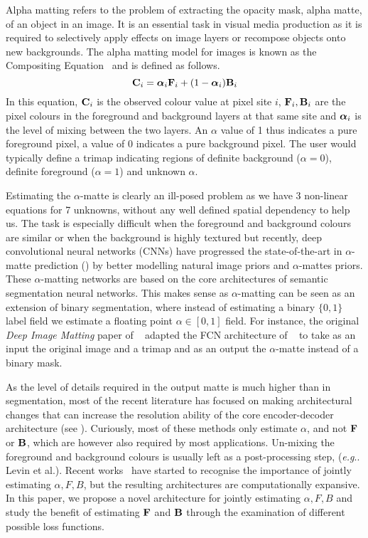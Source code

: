 \documentclass[runningheads]{llncs}
\makeatletter
\DeclareRobustCommand\onedot{\futurelet\@let@token\@onedot}
\def\@onedot{\ifx\@let@token.\else.\null\fi\xspace}
\def\eg{\emph{e.g}\onedot} \def\Eg{\emph{E.g}\onedot}
\makeatother
\begin{document}
Alpha matting refers to the problem of extracting the opacity mask, alpha matte,
of an object in an image. It is an essential task in visual media production as
it is required to selectively apply effects on image layers or recompose objects
onto new backgrounds. The alpha matting model for images is known as the
Compositing Equation~\cite{brinkman_compositing} and is defined as follows.
\begin{equation}
\mathbf{C}_i = \bm{{\alpha}}_i \mathbf{{{F}}}_i + (1-\bm{{\alpha}}_i)\mathbf{{{B}}}_i
\label{eq:matting}
\end{equation}
In this equation, $\mathbf{C}_i$ is the observed colour value at pixel site $i$,
$\mathbf{{{F}}}_i,\mathbf{{{B}}}_i$ are the pixel colours in the foreground and background layers at
that same site and $\bm{{\alpha}}_i$ is the level of mixing between the two
layers. An $\alpha$ value of 1 thus indicates a pure foreground pixel, a value
of 0 indicates a pure background pixel. The user would typically define a trimap
indicating regions of definite background ($\alpha=0$), definite foreground
($\alpha=1$) and unknown $\alpha$.

Estimating the $\alpha$-matte is clearly an ill-posed problem as we have 3
non-linear equations for 7 unknowns, without any well defined spatial dependency
to help us. The task is especially difficult when the foreground and background
colours are similar or when the background is highly textured but recently, deep
convolutional neural networks (CNNs) have progressed the state-of-the-art in
$\alpha$-matte prediction (\cite{DeepImageMatting,AlphaGAN,LearningBasedSamplingMatting,ContextMatting}) by better modelling natural image priors
and $\alpha$-mattes priors. These $\alpha$-matting networks are based on the
core architectures of semantic segmentation neural networks. This makes sense as
$\alpha$-matting can be seen as an extension of binary segmentation, where
instead of estimating a binary $\{0,1\}$ label field we estimate a floating
point $\alpha \in [0,1]$ field. For instance, the original \textit{Deep Image
  Matting} paper of ~\cite{DeepImageMatting} adapted the FCN architecture of
~\cite{FCN} to take as an input the original image and a trimap and as an output
the $\alpha$-matte instead of a binary mask.

As the level of details required in the output matte is much higher than in
segmentation, most of the recent literature has focused on making
architectural changes that can increase the resolution ability of the core
encoder-decoder architecture (see \cite{DeepImageMatting,IndexMatting,VDRNMatting,ContextMatting}). Curiously, most of these methods
only estimate $\alpha$, and not $\mathbf{{{F}}}$ or $\mathbf{{{B}}}$, which are however also required by
most applications. Un-mixing the foreground and background colours is usually
left as a post-processing step, (\eg Levin et al.\cite{ClosedFormMattingPAMI}). Recent works~\cite{ContextMatting,LearningBasedSamplingMatting}
have started to recognise the importance of jointly estimating $\alpha, F, B$,
but the resulting architectures are computationally expansive. In this paper, we
propose a novel architecture for jointly estimating $\alpha, F, B$ and
 study the benefit of  estimating $\mathbf{{{F}}}$ and $\mathbf{{{B}}}$ through the
examination of different possible loss functions.
\end{document}
